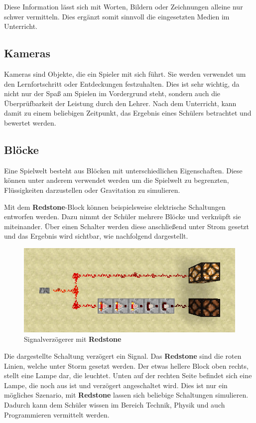Diese Information lässt sich mit Worten, Bildern oder Zeichnungen alleine nur schwer vermitteln. Dies ergänzt somit sinnvoll die eingesetzten Medien im Unterricht.

\subsection{Kameras}

Kameras sind Objekte, die ein Spieler mit sich führt. Sie werden verwendet um den Lernfortschritt oder Entdeckungen festzuhalten. Dies ist sehr wichtig, da nicht nur der Spaß am Spielen im Vordergrund steht, sondern auch die Überprüfbarkeit der Leistung durch den Lehrer. Nach dem Unterricht, kann damit zu einem beliebigen Zeitpunkt, das Ergebnis eines Schülers betrachtet und bewertet werden.

\subsection{Blöcke}

Eine Spielwelt besteht aus Blöcken mit unterschiedlichen Eigenschaften. Diese können unter anderem verwendet werden um die Spielwelt zu begrenzten, Flüssigkeiten darzustellen oder Gravitation zu simulieren.

Mit dem \textbf{Redstone}-Block können beispielsweise elektrische Schaltungen entworfen werden. Dazu nimmt der Schüler mehrere Blöcke und verknüpft sie miteinander. Über einen Schalter werden diese anschließend unter Strom gesetzt und das Ergebnis wird sichtbar, wie nachfolgend dargestellt.

\begin{figure}[ht]
	\centering
	\includegraphics[width=\textwidth,height=\textheight,keepaspectratio]{images/RedstoneSignalverzoegerer.png}
	\caption{Signalverzögerer mit \textbf{Redstone} \cite{GamepediaMinecraft}}
	\label{redstoneSignalDelay}
\end{figure}

Die dargestellte Schaltung verzögert ein Signal. Das \textbf{Redstone} sind die roten Linien, welche unter Storm gesetzt werden. Der etwas hellere Block oben rechts, stellt eine Lampe dar, die leuchtet. Unten auf der rechten Seite befindet sich eine Lampe, die noch aus ist und verzögert angeschaltet wird.
Dies ist nur ein mögliches Szenario, mit \textbf{Redstone} lassen sich beliebige Schaltungen simulieren.
Dadurch kann dem Schüler wissen im Bereich Technik, Physik und auch Programmieren vermittelt werden.


